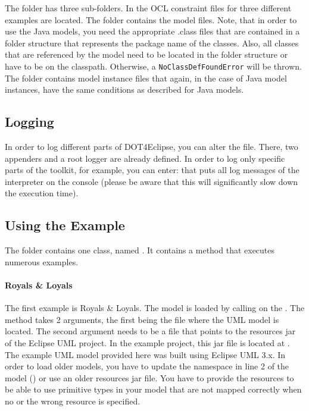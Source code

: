 The  folder has three sub-folders. In  the OCL constraint files for three different examples are located. The  folder contains the model files. Note, that in order to use the Java models, you need the appropriate .class files that are contained in a folder structure that represents the package name of the classes. Also, all classes that are referenced by the model need to be located in the folder structure or have to be on the classpath. Otherwise, a \lstinline[breaklines=true]{NoClassDefFoundError} will be thrown. The  folder contains model instance files that again, in the case of Java model instances, have the same conditions as described for Java models.

\subsection{Logging}

In order to log different parts of \acl{DOT4Eclipse}, you can alter the  file. There, two appenders and a root logger are already defined. In order to log only specific parts of the toolkit, for example, you can enter:  that puts all log messages of the interpreter on the console (please be aware that this will significantly slow down the execution time).

\subsection{Using the Example}

The  folder contains one class, named . It contains a  method that executes numerous examples. 

\paragraph{Royals \& Loyals}
The first example is Royals \& Loyals. The model is loaded by calling  on the . The method takes 2 arguments, the first being the file where the UML model is located. The second argument needs to be a file that points to the resources jar of the Eclipse UML project. In the example project, this jar file is located at . The example UML model provided here was built using Eclipse UML 3.x. In order to load older models, you have to update the namespace in line 2 of the model () or use an older resources jar file. You have to provide the resources to be able to use primitive types in your model that are not mapped correctly when no or the wrong resource is specified.

